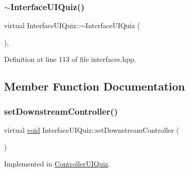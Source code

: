 \subsubsection{\texorpdfstring{$\sim$\+Interface\+U\+I\+Quiz()}{~InterfaceUIQuiz()}}
{\footnotesize\ttfamily virtual Interface\+U\+I\+Quiz\+::$\sim$\+Interface\+U\+I\+Quiz (\begin{DoxyParamCaption}\item[{\hyperlink{class_interface_u_i_quiz_a8a3301246ca34b00553527afef00eb23}{void}}]{ }\end{DoxyParamCaption})\hspace{0.3cm}{\ttfamily [inline]}, {\ttfamily [virtual]}}



Definition at line 113 of file interfaces.\+hpp.



\subsection{Member Function Documentation}
\mbox{\label{class_interface_u_i_quiz_a599dff405ea117a75c7084c2dd08ee28}} 
\subsubsection{\texorpdfstring{set\+Downstream\+Controller()}{setDownstreamController()}}
{\footnotesize\ttfamily virtual \hyperlink{class_interface_u_i_quiz_a8a3301246ca34b00553527afef00eb23}{void} Interface\+U\+I\+Quiz\+::set\+Downstream\+Controller (\begin{DoxyParamCaption}\item[{\hyperlink{class_interface_b_l_quiz}{Interface\+B\+L\+Quiz} $\ast$}]{ }\end{DoxyParamCaption})\hspace{0.3cm}{\ttfamily [pure virtual]}}



Implemented in \hyperlink{class_controller_u_i_quiz_a17083c1071e7bee3a1d4c0515d433907}{Controller\+U\+I\+Quiz}.

\mbox{\label{class_interface_u_i_quiz_a8a3301246ca34b00553527afef00eb23}} 
